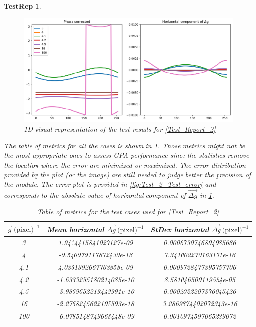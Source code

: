 \documentclass[12pt, titlepage]{article}
\newtheorem{TestRep}{TestRep}
\begin{document}
\begin{TestRep}
\begin{figure}[H]
\begin{center}
\includegraphics[scale=0.5]{Figures/Test_2_test_results.png}
\caption{1D visual representation of the test results for \cref{Test_Report_2}}
\label{fig:Test_2_Test_results}
\end{center}
\end{figure}

The table of metrics for all the cases is shown in \cref{tb:Metric_test_2_multiple_cases}. Those metrics might not be the most appropriate ones to assess GPA performance since the statistics remove the location where the error are minimized or maximized. The error distribution provided by the plot (or the image) are still needed to judge better the precision of the module. The error plot is provided in \cref{fig:Test_2_Test_error} and corresponds to the absolute value of horizontal component of $\overrightarrow{\Delta g}$ in \cref{fig:Test_2_Test_results}.

\begin{table}[H]
\centering
\begin{tabular}{|c|c|c|}
\hline
$\overrightarrow{g} \ \text{(pixel)}^{-1}$ & Mean horizontal $\overrightarrow{\Delta g} \ \text{(pixel)}^{-1}$ & StDev horizontal $\overrightarrow{\Delta g} \ \text{(pixel)}^{-1}$ \\
\hline
3 & 1.9414415841027127e-09 & 0.0006730746894985686 \\ \hline
\cellcolor{green} 4	 & \cellcolor{green} -9.540979117872439e-18 & \cellcolor{green} 7.341002270163171e-16 \\ \hline
\cellcolor[rgb]{1,0.8,0} 4.1 & \cellcolor[rgb]{1,0.8,0} 4.0351392667763858e-09 & \cellcolor[rgb]{1,0.8,0} 0.0009728477395757706 \\ \hline
4.2	& -1.6333255180214085e-10 & 8.581046509119554e-05 \\ \hline
4.5	& -3.9869652219449991e-10 & 0.0002022207376045426 \\ \hline
\cellcolor{green} 16 & \cellcolor{green} -2.2768245622195593e-18 & \cellcolor{green} 3.2869874402072343e-16 \\ \hline
\cellcolor[rgb]{1,0.8,0} 100 & \cellcolor[rgb]{1,0.8,0} -6.0785148749668448e-09 & \cellcolor[rgb]{1,0.8,0} 0.0010974597065239072 \\ \hline
\end{tabular}
\caption{Table of metrics for the test cases used for \cref{Test_Report_2}}\label{tb:Metric_test_2_multiple_cases}
\end{table}


\end{TestRep}
\end{document}
